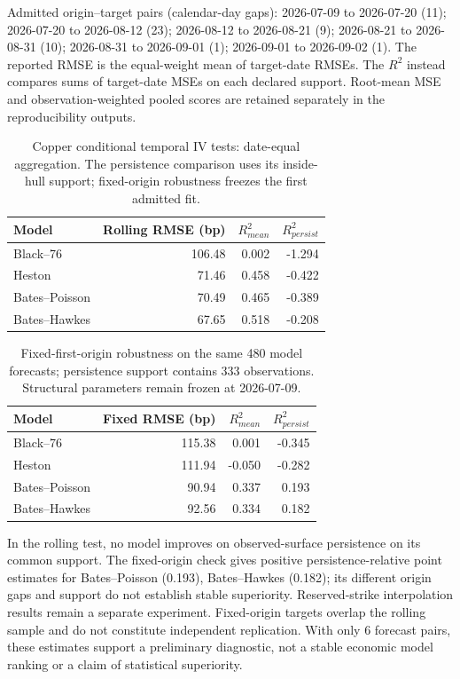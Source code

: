 Admitted origin--target pairs (calendar-day gaps): 2026-07-09 to 2026-07-20 (11); 2026-07-20 to 2026-08-12 (23); 2026-08-12 to 2026-08-21 (9); 2026-08-21 to 2026-08-31 (10); 2026-08-31 to 2026-09-01 (1); 2026-09-01 to 2026-09-02 (1).
The reported RMSE is the equal-weight mean of target-date RMSEs. The $R^2$ instead compares sums of target-date MSEs on each declared support. Root-mean MSE and observation-weighted pooled scores are retained separately in the reproducibility outputs.
\begin{table}[H]
\centering
\small
\caption{Copper conditional temporal IV tests: date-equal aggregation. The persistence comparison uses its inside-hull support; fixed-origin robustness freezes the first admitted fit.}
\label{tab:copper-temporal-models}
\begin{tabularx}{\textwidth}{@{}Xrrr@{}}
\toprule
Model & Rolling RMSE (bp) & $R^2_{mean}$ & $R^2_{persist}$ \\
\midrule
Black--76 & 106.48 & 0.002 & -1.294 \\
Heston & 71.46 & 0.458 & -0.422 \\
Bates--Poisson & 70.49 & 0.465 & -0.389 \\
Bates--Hawkes & 67.65 & 0.518 & -0.208 \\
\bottomrule
\end{tabularx}
\end{table}

\begin{table}[H]
\centering
\small
\caption{Fixed-first-origin robustness on the same 480 model forecasts; persistence support contains 333 observations. Structural parameters remain frozen at 2026-07-09.}
\label{tab:copper-fixed-origin}
\begin{tabularx}{\textwidth}{@{}Xrrr@{}}
\toprule
Model & Fixed RMSE (bp) & $R^2_{mean}$ & $R^2_{persist}$ \\
\midrule
Black--76 & 115.38 & 0.001 & -0.345 \\
Heston & 111.94 & -0.050 & -0.282 \\
Bates--Poisson & 90.94 & 0.337 & 0.193 \\
Bates--Hawkes & 92.56 & 0.334 & 0.182 \\
\bottomrule
\end{tabularx}
\end{table}

In the rolling test, no model improves on observed-surface persistence on its common support. The fixed-origin check gives positive persistence-relative point estimates for Bates--Poisson (0.193), Bates--Hawkes (0.182); its different origin gaps and support do not establish stable superiority. Reserved-strike interpolation results remain a separate experiment. Fixed-origin targets overlap the rolling sample and do not constitute independent replication. With only 6 forecast pairs, these estimates support a preliminary diagnostic, not a stable economic model ranking or a claim of statistical superiority.

